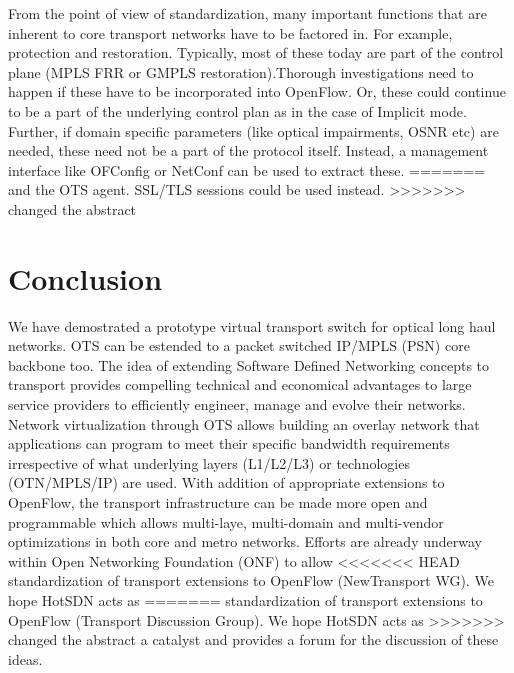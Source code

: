 \documentclass{sig-alternate-10pt}
\begin{document}
	From the point of view of standardization, many important functions that are inherent to core transport networks
	have to be factored in. For example, protection and restoration. Typically, most of these today are part of the
	control plane (MPLS FRR or GMPLS restoration).Thorough investigations need to happen if
	these have to be incorporated into OpenFlow. Or, these could continue to be a part of the underlying control
	plan as in the case of Implicit mode. Further, if domain specific parameters (like optical impairments, OSNR etc)
	are needed, these need not be a part of the protocol itself. Instead, a management interface like OFConfig or
	NetConf can be used to extract these.
=======
	and the OTS agent. SSL/TLS sessions could be used instead.
>>>>>>> changed the abstract

\section{Conclusion}
	We have demostrated a prototype virtual transport switch for optical long haul networks. OTS can be
	estended to a packet switched IP/MPLS (PSN) core backbone too. The idea of extending Software Defined
	Networking concepts to transport provides compelling technical and economical advantages to large service
	providers to efficiently engineer, manage and evolve their networks. Network virtualization through OTS
	allows building an overlay network that applications can program to meet their specific bandwidth
	requirements irrespective of what underlying layers (L1/L2/L3) or technologies (OTN/MPLS/IP) are used.
	With addition of appropriate extensions to OpenFlow, the transport infrastructure can be made more open
	and programmable which allows multi-laye, multi-domain and multi-vendor optimizations in both core and
	metro networks. Efforts are already underway within Open Networking Foundation (ONF) to allow
<<<<<<< HEAD
	standardization of transport extensions to OpenFlow (NewTransport WG). We hope HotSDN acts as
=======
	standardization of transport extensions to OpenFlow (Transport Discussion Group). We hope HotSDN acts as
>>>>>>> changed the abstract
	a catalyst and provides a forum for the discussion of these ideas.


 
\end{document}
